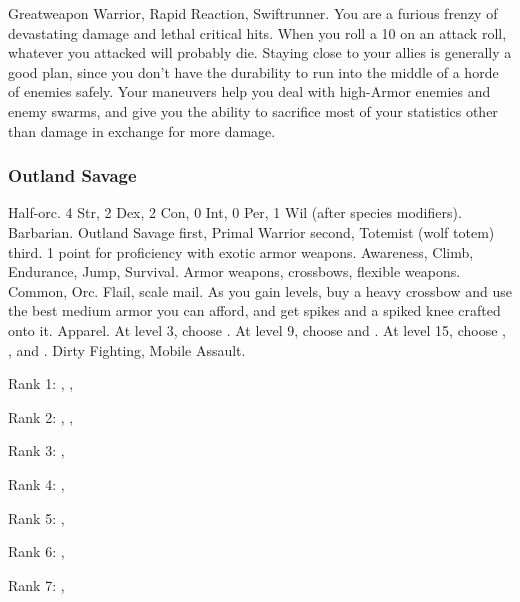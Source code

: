              Greatweapon Warrior, Rapid Reaction, Swiftrunner.
             You are a furious frenzy of devastating damage and lethal critical hits.
            When you roll a 10 on an attack roll, whatever you attacked will probably die.
            Staying close to your allies is generally a good plan, since you don't have the durability to run into the middle of a horde of enemies safely.
            Your maneuvers help you deal with high-Armor enemies and enemy swarms, and give you the ability to sacrifice most of your statistics other than damage in exchange for more damage.

        \subsubsection{Outland Savage}
             Half-orc.
             4 Str, 2 Dex, 2 Con, 0 Int, 0 Per, 1 Wil (after species modifiers).
             Barbarian.
             Outland Savage first, Primal Warrior second, Totemist (wolf totem) third.
             1 point for proficiency with exotic armor weapons.
             Awareness, Climb, Endurance, Jump, Survival.
             Armor weapons, crossbows, flexible weapons.
             Common, Orc.
             Flail, scale mail. As you gain levels, buy a heavy crossbow and use the best medium armor you can afford, and get spikes and a spiked knee crafted onto it.
             Apparel.
                At level 3, choose .
                At level 9, choose  and .
                At level 15, choose , , and .
             Dirty Fighting, Mobile Assault.
            \begin{raggeditemize}
                \item Rank 1: , , 
                \item Rank 2: , , 
                \item Rank 3: , 
                \item Rank 4: , 
                \item Rank 5: , 
                \item Rank 6: , 
                \item Rank 7: , 
            \end{raggeditemize}
